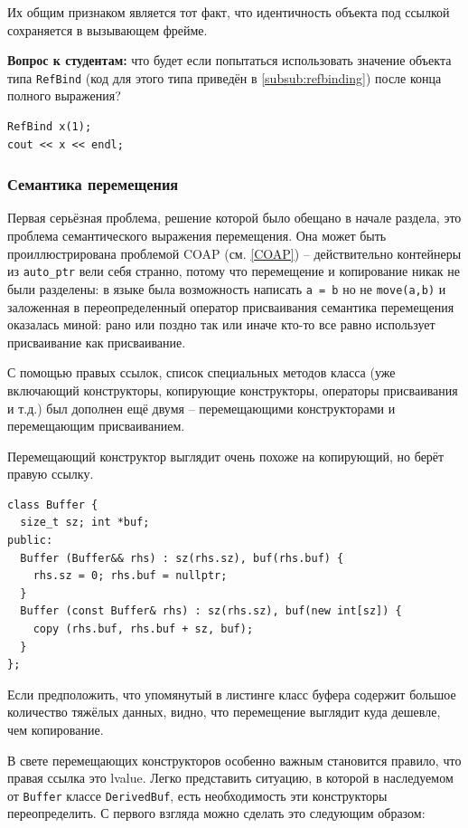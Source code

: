 \documentclass[a4paper,12pt,oneside]{article}
\newif\ifanswers
\begin{document}
Их общим признаком является тот факт, что идентичность объекта под ссылкой сохраняется в вызывающем фрейме.

\textbf{Вопрос к студентам:} что будет если попытаться использовать значение объекта типа \lstinline!RefBind! (код для этого типа приведён в \ref{subsub:refbinding}) после конца полного выражения?

\begin{lstlisting}
RefBind x(1);
cout << x << endl;
\end{lstlisting}

\ifanswers
Правильный ответ: dangling rvalue reference.
\fi

\subsubsection{Семантика перемещения}\label{subsub:movesemantics}

Первая серьёзная проблема, решение которой было обещано в начале раздела, это проблема семантического выражения перемещения. Она может быть проиллюстрирована проблемой COAP (см. \ref{COAP}) -- действительно контейнеры из \lstinline!auto_ptr! вели себя странно, потому что перемещение и копирование никак не были разделены: в языке была возможность написать \lstinline!a = b! но не \lstinline!move(a,b)! и заложенная в переопределенный оператор присваивания семантика перемещения оказалась миной: рано или поздно так или иначе кто-то все равно использует присваивание как присваивание.

С помощью правых ссылок, список специальных методов класса (уже включающий конструкторы, копирующие конструкторы, операторы присваивания и т.д.) был дополнен ещё двумя -- перемещающими конструкторами и перемещающим присваиванием.

Перемещающий конструктор выглядит очень похоже на копирующий, но берёт правую ссылку.

\begin{lstlisting}
class Buffer {
  size_t sz; int *buf;
public:
  Buffer (Buffer&& rhs) : sz(rhs.sz), buf(rhs.buf) { 
    rhs.sz = 0; rhs.buf = nullptr; 
  }
  Buffer (const Buffer& rhs) : sz(rhs.sz), buf(new int[sz]) { 
    copy (rhs.buf, rhs.buf + sz, buf); 
  }
};
\end{lstlisting}

Если предположить, что упомянутый в листинге класс буфера содержит большое количество тяжёлых данных, видно, что перемещение выглядит куда дешевле, чем копирование.

В свете перемещающих конструкторов особенно важным становится правило, что правая ссылка это lvalue. Легко представить ситуацию, в которой в наследуемом от \lstinline!Buffer! классе \lstinline!DerivedBuf!, есть необходимость эти конструкторы переопределить. С первого взгляда можно сделать это следующим образом:
\end{document}
